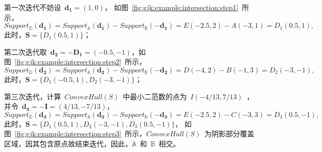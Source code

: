 \begin{inparaenum}[(1)]
\item 第一次迭代不妨设~$\bm{d_1} = (1,0)$，
如图~\ref{fig:gjk:example:intersection:step1}~所示，
$Support_\mathbb{D}(\bm{d_1})  = Support_\mathbb{A}(\bm{d_1}) - Support_\mathbb{B}(-\bm{d_1})  = E(-2.5, 2) - A(-3,1) = D_1(0.5, 1),$
此时，$\bm{S} = \{D_1(0.5, 1)\}$；\\ \indent
\item 第二次迭代取~$\bm{d_2}=-\bm{D_1}=(-0.5, -1)$，如图~\ref{fig:gjk:example:intersection:step2}~所示，
$Support_\mathbb{D}(\bm{d_2})   = Support_\mathbb{A}(\bm{d_2}) - Support_\mathbb{B}(-\bm{d_2})  = D(-4, 2) - B(-1, 3) = D_2(-3, -1),$
此时，$\bm{S} = \{D_1(-0.5, 1), D_2(-3, -1)\}$；\\ \indent
\item 第三次迭代，计算~$ConvexHull(S)$~中最小二范数的点为~$I(-4/13, 7/13)$~，
并令~$\bm{d_3}=-\bm{I}=(4/13, -7/13)$，
$ Support_\mathbb{D}(\bm{d_3})  = Support_\mathbb{A}(\bm{d_3}) - Support_\mathbb{B}(-\bm{d_3})  = E(-2.5, 2) - C(-3, 3) = D_3(0.5, -1),$
此时，$\bm{S} = \{D_1(0.5, 1), D_2(-3, -1), D_3(0.5, -1)\}$，
如图~\ref{fig:gjk:example:intersection:step3}~所示，$ConvexHull(S)$~为阴影部分覆盖区域，因其包含原点故结束迭代，因此，$\mathbb{A}$~和~$\mathbb{B}$~相交。
\end{inparaenum}
